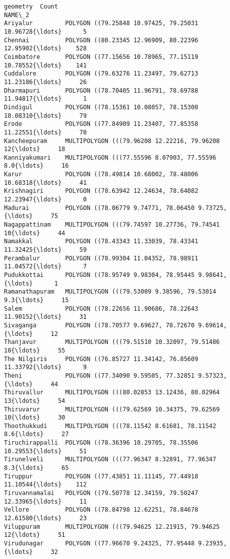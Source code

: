 \documentclass[11pt]{article}
\begin{document}
    \begin{Verbatim}[commandchars=\\\{\}]
                                                          geometry  Count
NAME\_2
Ariyalur         POLYGON ((79.25848 10.97425, 79.25031 10.96728{\ldots}      5
Chennai          POLYGON ((80.23345 12.96909, 80.22396 12.95902{\ldots}    528
Coimbatore       POLYGON ((77.15656 10.78965, 77.15119 10.78552{\ldots}    141
Cuddalore        POLYGON ((79.63276 11.23497, 79.62713 11.23186{\ldots}     26
Dharmapuri       POLYGON ((78.70405 11.96791, 78.69788 11.94817{\ldots}      1
Dindigul         POLYGON ((78.15361 10.08057, 78.15300 10.08310{\ldots}     79
Erode            POLYGON ((77.84909 11.23407, 77.85358 11.22551{\ldots}     70
Kancheepuram     MULTIPOLYGON (((79.96208 12.22216, 79.96208 12{\ldots}     18
Kanniyakumari    MULTIPOLYGON (((77.55596 8.07903, 77.55596 8.0{\ldots}     16
Karur            POLYGON ((78.49814 10.68002, 78.48006 10.68318{\ldots}     41
Krishnagiri      POLYGON ((78.63942 12.24634, 78.64082 12.23947{\ldots}      0
Madurai          POLYGON ((78.06779 9.74771, 78.06450 9.73725, {\ldots}     75
Nagappattinam    MULTIPOLYGON (((79.74597 10.27736, 79.74541 10{\ldots}     44
Namakkal         POLYGON ((78.43343 11.33039, 78.43341 11.32425{\ldots}     59
Perambalur       POLYGON ((78.99304 11.04352, 78.98911 11.04572{\ldots}      7
Pudukkottai      POLYGON ((78.95749 9.98304, 78.95445 9.98641, {\ldots}      1
Ramanathapuram   MULTIPOLYGON (((79.53009 9.38596, 79.53014 9.3{\ldots}     15
Salem            POLYGON ((78.22656 11.90686, 78.22643 11.90152{\ldots}     31
Sivaganga        POLYGON ((78.70577 9.69627, 78.72670 9.69614, {\ldots}     12
Thanjavur        MULTIPOLYGON (((79.51510 10.32097, 79.51486 10{\ldots}     55
The Nilgiris     POLYGON ((76.85727 11.34142, 76.85609 11.33792{\ldots}      9
Theni            POLYGON ((77.34090 9.59505, 77.32851 9.57323, {\ldots}     44
Thiruvallur      MULTIPOLYGON (((80.02853 13.12436, 80.02964 13{\ldots}     54
Thiruvarur       MULTIPOLYGON (((79.62569 10.34375, 79.62569 10{\ldots}     30
Thoothukkudi     MULTIPOLYGON (((78.11542 8.61681, 78.11542 8.6{\ldots}     27
Tiruchirappalli  POLYGON ((78.36396 10.29705, 78.35506 10.29553{\ldots}     51
Tirunelveli      MULTIPOLYGON (((77.96347 8.32891, 77.96347 8.3{\ldots}     65
Tiruppur         POLYGON ((77.43851 11.11145, 77.44918 11.10544{\ldots}    112
Tiruvannamalai   POLYGON ((79.50778 12.34159, 79.50247 12.33965{\ldots}     11
Vellore          POLYGON ((78.84798 12.62251, 78.84678 12.61580{\ldots}     23
Viluppuram       MULTIPOLYGON (((79.94625 12.21915, 79.94625 12{\ldots}     51
Virudunagar      POLYGON ((77.96670 9.24325, 77.95448 9.23935, {\ldots}     32
\end{Verbatim}
\end{document}
